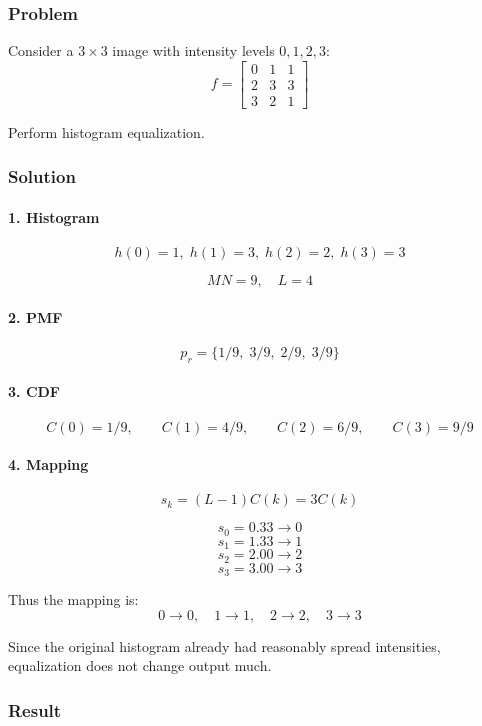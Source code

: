 \documentclass{AnantDocumentation}
\begin{document}
\subsubsection*{Problem}

Consider a \(3 \times 3\) image with intensity levels \(0,1,2,3\):  
\[
f =
\begin{bmatrix}
0 & 1 & 1 \\
2 & 3 & 3 \\
3 & 2 & 1
\end{bmatrix}
\]

Perform histogram equalization.

\subsubsection*{Solution}

\paragraph{1. Histogram}

\[
h(0)=1,\; h(1)=3,\; h(2)=2,\; h(3)=3
\]

\[
MN = 9,\quad L=4
\]

\paragraph{2. PMF}

\[
p_r = \{1/9,\; 3/9,\; 2/9,\; 3/9\}
\]

\paragraph{3. CDF}

\[
C(0)=1/9,\qquad
C(1)=4/9,\qquad
C(2)=6/9,\qquad
C(3)=9/9
\]

\paragraph{4. Mapping}

\[
s_k = (L-1) C(k) = 3C(k)
\]

\[
s_0 = 0.33 \to 0
\]
\[
s_1 = 1.33 \to 1
\]
\[
s_2 = 2.00 \to 2
\]
\[
s_3 = 3.00 \to 3
\]

Thus the mapping is:
\[
0 \to 0,\quad 1 \to 1,\quad 2 \to 2,\quad 3 \to 3
\]

Since the original histogram already had reasonably spread intensities, equalization does not change output much.

\subsubsection*{Result}
\end{document}
